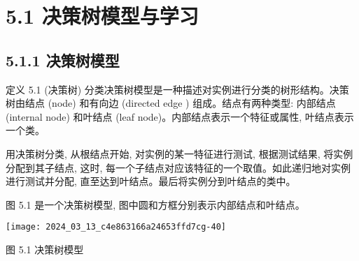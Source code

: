 \documentclass[10pt]{article}
\begin{document}
\section*{5.1 决策树模型与学习}
\subsection*{5.1.1 决策树模型}
定义 5.1 (决策树) 分类决策树模型是一种描述对实例进行分类的树形结构。决策树由结点 (node) 和有向边 (directed edge ) 组成。结点有两种类型: 内部结点 (internal node) 和叶结点 (leaf node)。内部结点表示一个特征或属性, 叶结点表示一个类。

用决策树分类, 从根结点开始, 对实例的某一特征进行测试, 根据测试结果, 将实例分配到其子结点, 这时, 每一个子结点对应该特征的一个取值。如此递归地对实例进行测试并分配, 直至达到叶结点。最后将实例分到叶结点的类中。

图 5.1 是一个决策树模型, 图中圆和方框分别表示内部结点和叶结点。

\begin{center}
\texttt{[image: 2024\_03\_13\_c4e863166a24653ffd7cg-40]}
\end{center}

图 5.1 决策树模型
\end{document}
